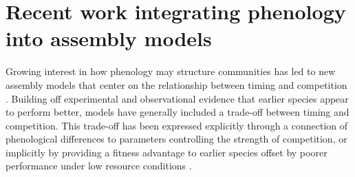 \documentclass{article}[12pt]
\begin{document}
\section{Recent work integrating phenology into assembly models} %


Growing interest in how phenology may structure communities has led to new assembly models that center on the relationship between timing and competition \citep{volkerisaj,wolkovich2021phenological,levine2022competition}. 
Building off experimental \citep{godoy2014} and observational \citep{wolkovich2013} evidence that earlier species appear to perform better, models have generally included a trade-off between timing and competition. 
This trade-off has been expressed explicitly through a connection of phenological differences to parameters controlling the strength of competition, or implicitly by providing a fitness advantage to earlier species offset by poorer performance under low resource conditions \citep[e.g., $R^*$ in][]{wolkovich2021phenological,levine2022competition}.
\end{document}
